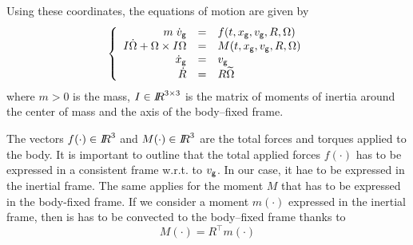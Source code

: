 Using these coordinates, the equations of motion are given by
\begin{equation}
  \label{eq:motion-NewtonEuler}
  \left\{\begin{array}{rcl}
      m \;\dot v_{\sf \small g}  & = &f(t,x_{\sf \small g}, v_{\sf \small g},  R,  \Omega) \\
      I \dot \Omega + \Omega \times I \Omega &= & M(t,x_{\sf \small g}, v_{\sf \small g}, R, \Omega) \\
      \dot x_{\sf \small g}&=& v_{\sf \small g}\\
      \dot R  &=& R \widetilde \Omega
    \end{array}
  \right.
\end{equation}
where $m> 0$ is the mass, $I\in \mbox{\rm $I\!\!R$}^{3\times 3}$ is the matrix of moments of inertia around the center of mass and the axis of the body--fixed frame.

The vectors $f(\cdot)\in \mbox{\rm $I\!\!R$}^3$ and $M(\cdot)\in \mbox{\rm $I\!\!R$}^3$ are the total forces and torques applied to the body. It is important to outline that the total applied forces $f(\cdot)$ has to be expressed in a consistent frame w.r.t. to $v_{\sf \small g}$. In our case, it hae to be expressed in the inertial frame. The same applies for the moment $M$ that has to be expressed in the body-fixed frame. If we consider a moment $m(\cdot)$ expressed in the inertial frame, then is has to be convected to  the body--fixed frame thanks to
\begin{equation}
  \label{eq:convected_moment}
  M (\cdot) =R^\top  m (\cdot)
\end{equation}


